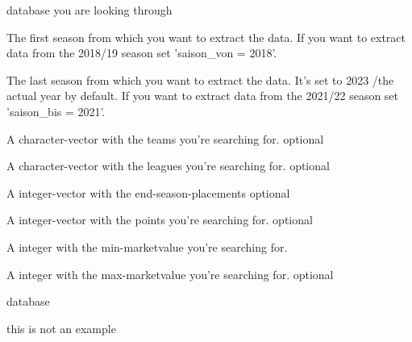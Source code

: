 \documentclass[letterpaper]{book}
\begin{document}
%
\begin{Arguments}
\begin{ldescription}
\item[\code{data}] database you are looking through

\item[\code{saison\_von}] The first season from which you want to extract the data. If you want to extract data from the 2018/19 season set 'saison\_von = 2018'.

\item[\code{saison\_bis}] The last season from which you want to extract the data. It's set to 2023 /the actual year by default.
If you want to extract data from the 2021/22 season set 'saison\_bis = 2021'.

\item[\code{teams}] A character-vector with the teams you're searching for. optional

\item[\code{ligen}] A character-vector with the leagues you're searching for. optional

\item[\code{platzierungen}] A integer-vector with the end-season-placements optional

\item[\code{punkte}] A integer-vector with the points you're searching for. optional

\item[\code{marktwert\_von}] A integer with the min-marketvalue you're searching for.

\item[\code{marktwert\_bis}] A integer with the max-marketvalue you're searching for. optional
\end{ldescription}
\end{Arguments}
%
\begin{Value}
database
\end{Value}
%
\begin{Examples}
\begin{ExampleCode}
this is not an example
\end{ExampleCode}
\end{Examples}
\printindex{}
\end{document}
